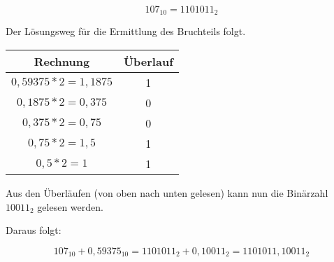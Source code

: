 \documentclass{article}
\begin{document}
$$
107_{10} = 1101011_{2}
$$

Der Lösungsweg für die Ermittlung des Bruchteils folgt.

\begin{center}
\begin{tabular}{ c | c }
    Rechnung & Überlauf\\
    \hline
    $0,59375 * 2 = 1,1875$ & 1\\
    $0,1875 * 2 = 0,375$ & 0\\
    $0,375 * 2 = 0,75$ & 0\\
    $0,75 * 2 = 1,5$ & 1\\
    $0,5 * 2 = 1$ & 1
\end{tabular}
\end{center}

Aus den Überläufen (von oben nach unten gelesen) kann nun die Binärzahl $10011_2$ gelesen werden.

Daraus folgt:

$$
107_{10} + 0,59375_{10} = 1101011_{2} + 0,10011_{2} = 1101011,10011_2
$$
\end{document}
